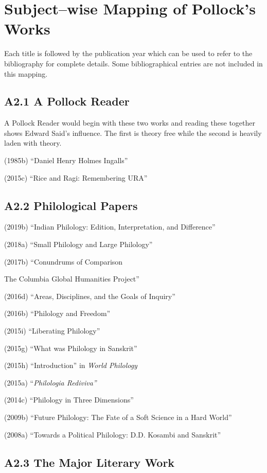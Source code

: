 
\chapter{Subject–wise Mapping of Pollock’s Works}\label{Anubandha2}

Each title is followed by the publication year which can be used to refer to the bibliography for complete details. Some bibliographical entries are not included in this mapping.

\section*{A2.1 A Pollock Reader}

A Pollock Reader would begin with these two works and reading these together shows Edward Said’s influence. The first is theory free while the second is heavily laden with theory.

(1985b) “Daniel Henry Holmes Ingalls”

(2015c) “Rice and Ragi: Remembering URA”


\section*{A2.2 Philological Papers}

(2019b) “Indian Philology: Edition, Interpretation, and Difference”

(2018a) “Small Philology and Large Philology”

(2017b) “Conundrums of Comparison

The Columbia Global Humanities Project”

(2016d) “Areas, Disciplines, and the Goals of Inquiry”

(2016b) “Philology and Freedom”

(2015i) “Liberating Philology”

(2015g) “What was Philology in Sanskrit”

(2015h) “Introduction” in \textit{World Philology}

(2015a) “\textit{Philologia Rediviva”}

(2014c) “Philology in Three Dimensions”

(2009b) “Future Philology: The Fate of a Soft Science in a Hard World”

(2008a) “Towards a Political Philology: D.D. Kosambi and Sanskrit”


\section*{A2.3 The Major Literary Work}

